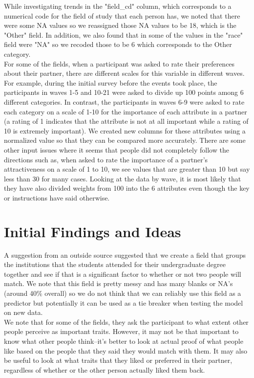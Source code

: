 \documentclass{article}
\begin{document}
While investigating trends in the "field\_cd" column, which corresponds to a numerical code for the field of study that each person has, we noted that there were some NA values  so we reassigned those NA values to be 18, which is the "Other" field.  In addition, we also found that in some of the values in the "race" field were "NA" so we recoded those to be 6 which corresponds to the Other category.\\

For some of the fields, when a participant was asked to rate their preferences about their partner, there are different scales for this variable in different waves.  For example, during the initial survey before the events took place, the participants in waves 1-5 and 10-21 were asked to divide up 100 points among 6 different categories.  In contrast, the participants in waves 6-9 were asked to rate each category on a scale of 1-10 for the importance of each attribute in a partner (a rating of 1 indicates that the attribute is not at all important while a rating of 10 is extremely important).  We created new columns for these attributes using a normalized value so that they can be compared more accurately. There are some other input issues where it seems that people did not completely follow the directions such as, when asked to rate the importance of a partner's attractiveness on a scale of 1 to 10, we see values that are greater than 10 but say less than 30 for many cases. Looking at the data by wave, it is most likely that they have also divided weights from 100 into the 6 attributes even though the key or instructions have said otherwise.

\section{Initial Findings and Ideas}
A suggestion from an outside source suggested that we create a field that groups the institutions that the students attended for their undergraduate degree together and see if that is a significant factor to whether or not two people will match.  We note that this field is pretty messy and has many blanks or NA's (around 40\% overall) so we do not think that we can reliably use this field as a predictor but potentially it can be used as a tie breaker when testing the model on new data.\\

We note that for some of the fields, they ask the participant to what extent other people perceive as important traits. However, it may not be that important to know what other people think--it's better to look at actual proof of what people like based on the people that they said they would match with them.  It may also be useful to look at what traits that they liked or preferred in their partner, regardless of whether or the other person actually liked them back.\\
\end{document}
